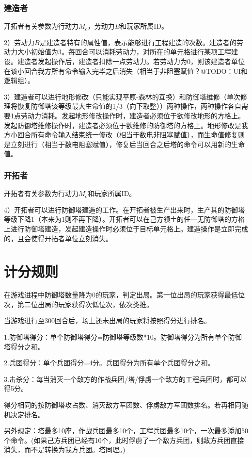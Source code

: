 \documentclass[a4paper,4pt]{article}
\begin{document}
\subsubsection{建造者}
开拓者有关参数为行动力$M_c$，劳动力$B$和玩家所属ID。\par
2）劳动力$B$是建造者特有的属性值，表示能够进行工程建造的次数。建造者的劳动力大小初始值为3。每回合可以消耗劳动力，对所在的单元格进行某项工程建设。建造者发起操作后，建造者扣除一点劳动力。若劳动力为0，则该建造者单位在该小回合我方所有命令输入完毕之后消失（相当于非阻塞赋值？@TODO：UI和逻辑组）。\par %
3）建造者可以进行地形修改（只能实现平原-森林的互换）和防御塔维修（单次修理将恢复防御塔该等级最大生命值的1/3（向下取整））两种操作，两种操作各自需要1点劳动力消耗。发起地形修改操作时，建造者必须位于欲修改地形的方格上。发起防御塔维修操作时，建造者必须位于欲维修的防御塔的方格上。地形修改是我方小回合所有命令输入结束统一修改（相当于数电非阻塞赋值），而生命值修复则是立刻进行（相当于数电阻塞赋值），修复后当回合之后塔的命令可以用新的生命值。
\subsubsection{开拓者}
开拓者有关参数为行动力$M_c$和玩家所属ID。\par
4）开拓者可以进行防御塔建造的工作。在开拓者被生产出来时，生产其的防御塔等级下降1（本来为1则不再下降）。开拓者可以在己方领土的任一无防御塔的方格上进行防御塔建造，发起建造操作时必须位于目标单元格上。建造操作是立即完成的，且会使得开拓者单位立刻消失。


\section{计分规则}
在游戏进程中防御塔数量降为0的玩家，判定出局。第一位出局的玩家获得最低位次，第二位出局的玩家获得次低位次，依次类推。\par
当游戏进行至300回合后，场上还未出局的玩家将按照得分进行排名。\par
1.防御塔得分：单个防御塔得分=防御塔等级数*10。防御塔得分为所有单个防御塔得分之和。\par
2.兵团得分：单个兵团得分=4分。兵团得分为所有单个兵团得分之和。\par
3.击杀分：每当消灭一个敌方的作战兵团/塔/俘虏一个敌方的工程兵团时，都可以得5分。\par
得分相同的按防御塔攻占数、消灭敌方军团数、俘虏敌方军团数排名。若再相同随机决定排名。\par
另外规定：塔最多10座，作战兵团最多10个，工程兵团最多10个，一次最多添加50个命令。(如果己方兵团已经有10个，此时俘虏了一个敌方兵团，则敌方兵团直接消失，而不是转换为我方兵团。塔同理。)
\end{document}

